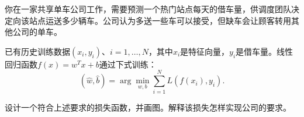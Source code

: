 你在一家共享单车公司工作，需要预测一个热门站点每天的借车量，供调度团队决定向该站点运送多少辆车。公司认为多送一些车可以接受，但缺车会让顾客转用其他公司的单车。


已有历史训练数据\((x_i,y_i)\)、\(i=1,\ldots,N\)，其中\(x_i\)是特征向量，\(y_i\)是借车量。线性回归函数\(f(x)=w^Tx+b\)通过下式训练：
\[
(\hat w,\hat b)=\arg\min_{w,b}\sum_{i=1}^N L(f(x_i),y_i).
\]


设计一个符合上述要求的损失函数，并画图。解释该损失怎样实现公司的要求。
